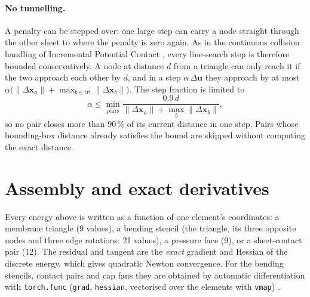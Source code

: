 \documentclass[11pt,a4paper]{article}
\newcommand{\vect}[1]{\bm{#1}}
\newcommand{\x}{\vect{x}}
\newcommand{\uu}{\vect{u}}
\newcommand{\code}[1]{\texttt{#1}}
\theoremstyle{remark}
\begin{document}
\paragraph{No tunnelling.} A penalty can be stepped over: one large step can carry a node straight
through the other sheet to where the penalty is zero again. As in the continuous collision
handling of Incremental Potential Contact \cite{li2020ipc}, every line-search step is therefore
bounded conservatively. A node at distance $d$ from a triangle can only reach it if the two
approach each other by $d$, and in a step $\alpha\,\Delta\uu$ they approach by at most
$\alpha\big(\|\Delta\x_a\| + \max_{b\in\text{tri}}\|\Delta\x_b\|\big)$. The step fraction is
limited to
\begin{equation}
\alpha \le \min_{\text{pairs}} \frac{0.9\,d}{\|\Delta\x_a\| + \max_b\|\Delta\x_b\|},
\end{equation}
so no pair closes more than $90\,\%$ of its current distance in one step. Pairs whose bounding-box
distance already satisfies the bound are skipped without computing the exact distance.

\section{Assembly and exact derivatives}\label{sec:assembly}

Every energy above is written as a function of one element's coordinates: a membrane triangle
(9 values), a bending stencil (the triangle, its three opposite nodes and three edge rotations:
21 values), a pressure face (9), or a sheet-contact pair (12). The residual and tangent are the
\emph{exact} gradient and Hessian of the discrete energy, which gives quadratic Newton
convergence. For the bending stencils, contact pairs and cap fans they are obtained by automatic
differentiation with \code{torch.func} (\code{grad}, \code{hessian}, vectorised over the elements
with \code{vmap}) \cite{paszke2019}.
\end{document}
